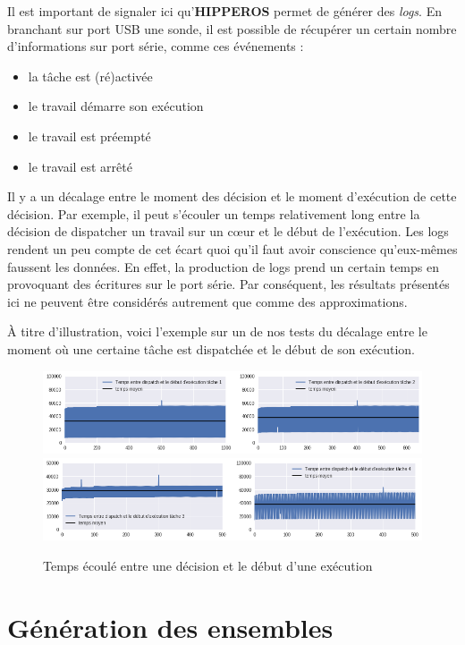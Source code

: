 	Il est important de signaler ici qu'\textbf{HIPPEROS} permet de générer des \textit{logs}.
	En branchant sur port USB une sonde, il est possible de récupérer 
	un certain nombre d'informations sur port série, comme ces événements :
	\begin{itemize}
		\item la tâche est (ré)activée
		\item le travail démarre son exécution
		\item le travail est préempté
		\item le travail est arrêté
	\end{itemize}
	Il y a un décalage entre le moment des décision et le moment d'exécution de cette décision. Par exemple, il peut s'écouler un temps relativement long 
	entre la décision de dispatcher un travail sur un cœur et le début de l'exécution. Les logs rendent un peu compte de cet écart 
	quoi qu'il faut avoir conscience qu'eux-mêmes faussent les données.
	En effet, la production de logs prend un certain temps en provoquant des écritures 
	sur le port série.
	Par conséquent, les résultats présentés ici ne peuvent 
	être considérés autrement que comme des approximations.\newline
	
	À titre d'illustration, voici l'exemple sur un de nos tests du décalage entre 
	le moment où une certaine tâche est dispatchée et le début de son exécution.

	
\begin{figure}[H]
	\label{4tasksdispatch}
	\caption{Temps écoulé entre une décision et le début d'une exécution}
	\includegraphics[scale=0.5]{img/wcet/dispacth1}
	\includegraphics[scale=0.5]{img/wcet/dispacth2}
\end{figure}
	
	
	
\section{Génération des ensembles}

